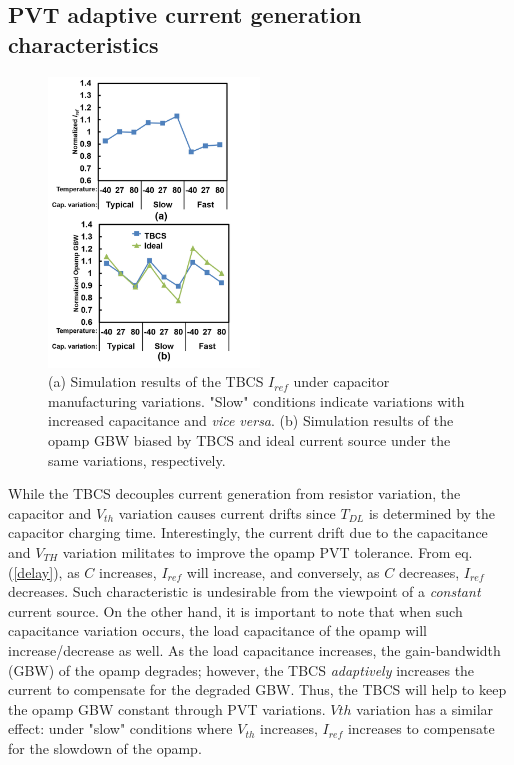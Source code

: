 \documentclass[paper]{ieice}
\begin{document}
\subsection{PVT adaptive current generation characteristics}
\begin{figure}[!t]
\centering
 \includegraphics[width=0.5\textwidth]{figs/iref_var.png}
  \caption{(a) Simulation results of the TBCS $I_{ref}$ under capacitor manufacturing variations. "Slow" conditions indicate variations with increased capacitance and \textit{vice versa}.  (b) Simulation results of the opamp GBW biased by TBCS and ideal current source under the same variations, respectively.}
\label{cvar}
\end{figure}

\qquad While the TBCS decouples current generation from resistor variation, the capacitor and $V_{th}$ variation causes current drifts since $T_{DL}$ is determined by the capacitor charging time. Interestingly, the current drift due to the capacitance and $V_{TH}$ variation militates to improve the opamp PVT tolerance.
From eq.(\ref{delay}), as $C$ increases, $I_{ref}$ will increase, and conversely, as $C$ decreases, $I_{ref}$ decreases. Such characteristic is undesirable from the viewpoint of a \textit{constant} current source. On the other hand, it is important to note that when such capacitance variation occurs, the load capacitance of the opamp will increase/decrease as well. As the load capacitance increases, the gain-bandwidth (GBW) of the opamp degrades; however, the TBCS \textit{adaptively} increases the current to compensate for the degraded GBW. Thus, the TBCS will help to keep the opamp GBW constant through PVT variations. $V{th}$ variation has a similar effect: under "slow" conditions where $V_{th}$ increases, $I_{ref}$ increases to compensate for the slowdown of the opamp.
\end{document}

